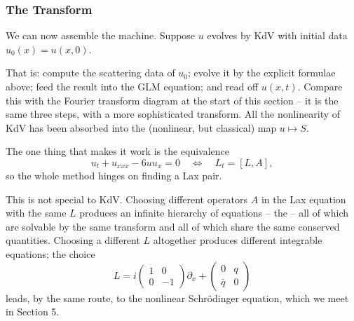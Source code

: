 \documentclass[a4paper]{scrartcl}
\begin{document}
\subsubsection{The Transform}

We can now assemble the machine. Suppose $u$ evolves by KdV with initial data $u_0(x) = u(x,0)$.
\begin{center}
\end{center}

That is: compute the scattering data of $u_0$; evolve it by the explicit formulae above; feed the result into the GLM equation; and read off $u(x,t)$. Compare this with the Fourier transform diagram at the start of this section -- it is the same three steps, with a more sophisticated transform. All the nonlinearity of KdV has been absorbed into the (nonlinear, but classical) map $u\mapsto S$.

The one thing that makes it work is the equivalence
$$
u_t + u_{xxx} - 6uu_x = 0 \quad\Longleftrightarrow\quad L_t = [L,A],
$$
so the whole method hinges on finding a Lax pair.

\begin{remark}
	This is not special to KdV. Choosing different operators $A$ in the Lax equation with the same $L$ produces an infinite hierarchy of equations -- the  -- all of which are solvable by the same transform and all of which share the same conserved quantities. Choosing a different $L$ altogether produces different integrable equations; the choice
	$$
	L = i\begin{pmatrix}1 & 0\\0&-1\end{pmatrix}\partial_x + \begin{pmatrix}0 & q\\ \bar q & 0\end{pmatrix}
	$$
	leads, by the same route, to the nonlinear Schr\"odinger equation, which we meet in Section 5.
\end{remark}
\end{document}

